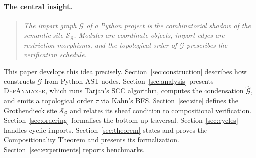 \documentclass[11pt]{article}
\newcommand{\IG}{\mathcal{G}}              %
\newcommand{\DA}{\textsc{DepAnalyzer}}     %
\newcommand{\TopoOrd}{\tau}                %
\newcommand{\CondGraph}{\widehat{\IG}}     %
\newcommand{\ModSite}{\mathcal{S}_{\IG}}   %
\begin{document}
\paragraph{The central insight.}
\begin{quote}
  \itshape
  The import graph $\IG$ of a Python project is the combinatorial
  shadow of the semantic site $\ModSite$.  Modules are coordinate
  objects, import edges are restriction morphisms, and the topological
  order of $\IG$ prescribes the verification schedule.
\end{quote}

This paper develops this idea precisely.  Section~\ref{sec:construction}
describes how \JuGeo{} constructs $\IG$ from Python AST nodes.
Section~\ref{sec:analysis} presents \DA{}, which runs Tarjan's SCC
algorithm, computes the condensation $\CondGraph$, and emits a
topological order $\TopoOrd$ via Kahn's BFS.
Section~\ref{sec:site} defines the Grothendieck site $\ModSite$ and
relates its sheaf condition to compositional verification.
Section~\ref{sec:ordering} formalises the bottom-up traversal.
Section~\ref{sec:cycles} handles cyclic imports.
Section~\ref{sec:theorem} states and proves the Compositionality Theorem
and presents its \LEAN{} formalization.
Section~\ref{sec:experiments} reports benchmarks.
\end{document}
